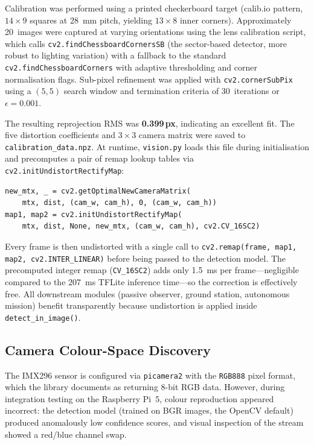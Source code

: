 Calibration was performed using a printed checkerboard target (calib.io pattern, $14 \times 9$ squares at \SI{28}{\milli\metre} pitch, yielding $13 \times 8$ inner corners).  Approximately 20~images were captured at varying orientations using the lens calibration script, which calls \texttt{cv2.findChessboardCornersSB} (the sector-based detector, more robust to lighting variation) with a fallback to the standard \texttt{cv2.findChessboardCorners} with adaptive thresholding and corner normalisation flags.  Sub-pixel refinement was applied with \texttt{cv2.cornerSubPix} using a $(5,5)$ search window and termination criteria of 30~iterations or $\epsilon = 0.001$.

The resulting reprojection RMS was \textbf{0.399\,px}, indicating an excellent fit. The five distortion coefficients and $3\times3$ camera matrix were saved to \texttt{calibration\_data.npz}. At runtime, \texttt{vision.py} loads this file during initialisation and precomputes a pair of remap lookup tables via \texttt{cv2.initUndistortRectifyMap}:

\begin{verbatim}
new_mtx, _ = cv2.getOptimalNewCameraMatrix(
    mtx, dist, (cam_w, cam_h), 0, (cam_w, cam_h))
map1, map2 = cv2.initUndistortRectifyMap(
    mtx, dist, None, new_mtx, (cam_w, cam_h), cv2.CV_16SC2)
\end{verbatim}

Every frame is then undistorted with a single call to \texttt{cv2.remap(frame, map1, map2, cv2.INTER\_LINEAR)} before being passed to the detection model. The precomputed integer remap (\texttt{CV\_16SC2}) adds only \SI{1.5}{\milli\second} per frame---negligible compared to the \SI{207}{\milli\second} TFLite inference time---so the correction is effectively free. All downstream modules (passive observer, ground station, autonomous mission) benefit transparently because undistortion is applied inside \texttt{detect\_in\_image()}.

\subsection{Camera Colour-Space Discovery}\label{sec:cal:colour}

The IMX296 sensor is configured via \texttt{picamera2} with the \texttt{RGB888} pixel format, which the library documents as returning 8-bit RGB data. However, during integration testing on the Raspberry Pi~5, colour reproduction appeared incorrect: the detection model (trained on BGR images, the OpenCV default) produced anomalously low confidence scores, and visual inspection of the stream showed a red/blue channel swap.

